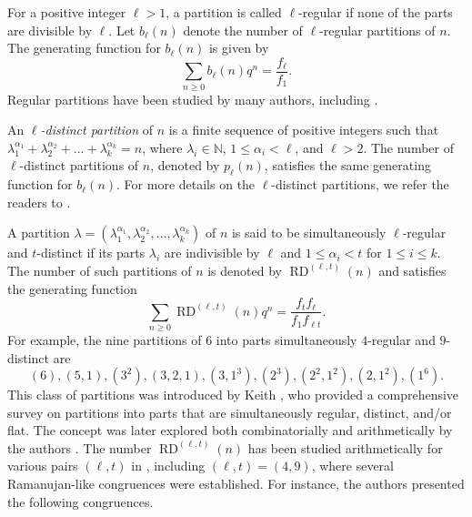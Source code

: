 \documentclass[12pt]{amsart}
\DeclareMathOperator {\myRD}{RD}
\theoremstyle{plain}
\theoremstyle{definition}
\begin{document}
For a positive integer $\ell>1$, a partition is called $\ell$-regular if none of the parts are divisible by $\ell$. Let $b_{\ell}(n)$ denote the number of $\ell$-regular partitions of $n$. The generating function for $b_{\ell}(n)$ is given by
\[
\sum\limits_{n\geq 0} b_{\ell}(n) q^{n}= \dfrac{f_{\ell}}{f_{1}}.
\]
Regular partitions have been studied by many authors, including \cite{bb, r1, r2, r3, r4, r5, r6}.

An \textit{$\ell$-distinct partition} of  $n$ is a finite sequence of positive integers such that $\lambda_{1}^{\alpha_{1}}+ \lambda_{2}^{\alpha_{2}}+\dots+ \lambda_{k}^{\alpha_{k}}=n$, where $\lambda_{i} \in \mathbb{N}$, $1\leq \alpha_{i}< \ell$, and $\ell>2$. The number of $\ell$-distinct partitions of $n$, denoted by $p_{\ell}(n)$, satisfies the same generating function for $b_{\ell}(n)$. For more details on the $\ell$-distinct partitions, we refer the readers to \cite{r8, r9}.

A partition $\lambda=(\lambda_{1}^{\alpha_{1}},\lambda_{2}^{\alpha_{2}}, \dots, \lambda_{k}^{\alpha_{k}})$ of $n$ is said to be simultaneously $\ell$-regular and $t$-distinct if its parts $\lambda_{i}$ are indivisible by $\ell$ and $1\leq \alpha_{i} < t$ for $1\leq i \leq k$.  The number of such partitions of $n$ is denoted by $\myRD^{(\ell, t)}(n)$ and satisfies the generating function
\begin{equation} 
\sum_{n \geq 0} \myRD^{(\ell,t)}(n) q^{n} = \dfrac{f_{t}f_{\ell}}{f_{1}f_{\ell t}}. \label{mainequation} 
\end{equation}
For example, the nine partitions of $6$ into parts simultaneously $4$-regular and $9$-distinct are
\[
(6), (5,1), (3^2), (3,2,1), (3,1^3), (2^3), (2^2,1^2), (2,1^2), (1^6).
\]
This class of partitions was introduced by Keith \cite{r10}, who provided a comprehensive survey on partitions into parts that are simultaneously regular, distinct, and/or flat. The concept was later explored both combinatorially and arithmetically by the authors \cite{NadjiAhmia2024}. The number $\myRD^{(\ell,t)}(n)$ has been studied arithmetically for various pairs $(\ell, t)$ in \cite{NadjiAhmia2024}, including $(\ell, t)=(4,9)$, where several Ramanujan-like congruences  were established. For instance, the authors \cite{NadjiAhmia2024} presented the following congruences.
\end{document}
